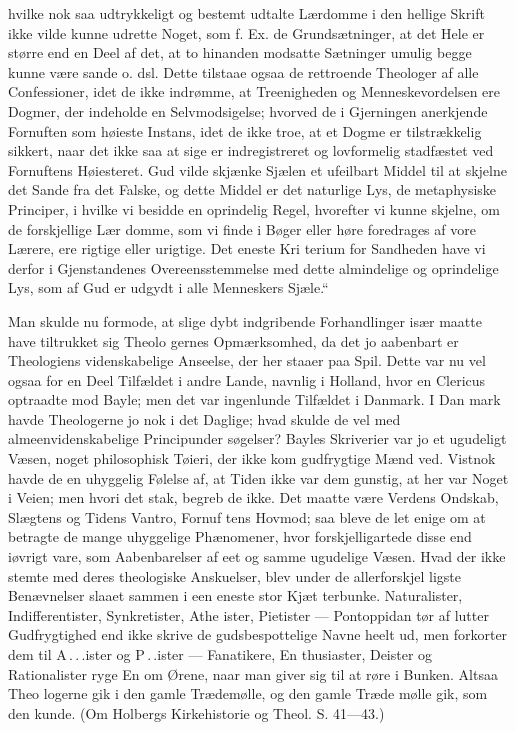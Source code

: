 \documentclass[12pt]{book}
\newcommand{\opage}[1]{\marginnote{\footnotesize\textit{[#1]}}}
\begin{document}
hvilke nok saa udtrykkeligt og bestemt udtalte Lærdomme
i den hellige Skrift ikke vilde kunne udrette Noget, som
f. Ex. de Grundsætninger, at det Hele er større end en
Deel af det, at to hinanden modsatte Sætninger umulig
begge kunne være sande o. dsl. Dette tilstaae ogsaa
de rettroende Theologer af alle Confessioner, idet de ikke
indrømme, at Treenigheden og Menneskevordelsen ere
Dogmer, der indeholde en Selvmodsigelse; hvorved de
i Gjerningen anerkjende Fornuften som høieste Instans,
idet de ikke troe, at et Dogme er tilstrækkelig sikkert,
naar det ikke saa at sige er indregistreret og lovformelig
stadfæstet ved Fornuftens Høiesteret. Gud vilde skjænke
Sjælen et ufeilbart Middel til at skjelne det Sande fra
det Falske, og dette Middel er det naturlige Lys, de
metaphysiske Principer, i hvilke vi besidde en oprindelig
Regel, hvorefter vi kunne skjelne, om de forskjellige Lær\-%
domme, som vi finde i Bøger eller høre foredrages af
vore Lærere, ere rigtige eller urigtige. Det eneste Kri\-%
terium for Sandheden have vi derfor i Gjenstandenes
Overeensstemmelse med dette almindelige og oprindelige
Lys, som af Gud er udgydt i alle Menneskers Sjæle.“

Man skulde nu formode, at slige dybt indgribende
Forhandlinger især maatte have tiltrukket sig Theolo\-%
gernes Opmærksomhed, da det jo aabenbart er Theologiens
videnskabelige Anseelse, der her staaer paa Spil. Dette
var nu vel ogsaa for en Deel Tilfældet i andre Lande,
navnlig i Holland, hvor en Clericus optraadte mod Bayle;
men det var ingenlunde Tilfældet i Danmark. I Dan\-%
mark havde Theologerne jo nok i det Daglige; hvad
skulde de vel med almeenvidenskabelige Principunder\-%
\opage{270}\setcounter{footnote}{0}%
søgelser? Bayles Skriverier var jo et ugudeligt Væsen,
noget philosophisk Tøieri, der ikke kom gudfrygtige
Mænd ved. Vistnok havde de en uhyggelig Følelse af,
at Tiden ikke var dem gunstig, at her var Noget i Veien;
men hvori det stak, begreb de ikke. Det maatte være
Verdens Ondskab, Slægtens og Tidens Vantro, Fornuf\-%
tens Hovmod; saa bleve de let enige om at betragte de
mange uhyggelige Phænomener, hvor forskjelligartede
disse end iøvrigt vare, som Aabenbarelser af eet og
samme ugudelige Væsen. Hvad der ikke stemte med
deres theologiske Anskuelser, blev under de allerforskjel\-%
ligste Benævnelser slaaet sammen i een eneste stor Kjæt\-%
terbunke. Naturalister, Indifferentister, Synkretister, Athe\-%
ister, Pietister --- Pontoppidan tør af lutter Gudfrygtighed
end ikke skrive de gudsbespottelige Navne heelt ud, men
forkorter dem til A\,.\,.\,.ister og P\,.\,.ister --- Fanatikere, En\-%
thusiaster, Deister og Rationalister ryge En om Ørene,
naar man giver sig til at røre i Bunken. Altsaa Theo\-%
logerne gik i den gamle Trædemølle, og den gamle Træde\-%
mølle gik, som den kunde. (Om Holbergs Kirkehistorie
og Theol. S. 41---43.)
\end{document}
